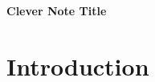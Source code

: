 \documentclass[12pt]{article}
\begin{document}
\thispagestyle{empty}		%

\begin{center}
    {\huge \textbf{Clever Note Title} \par}
\end{center}



\section{Introduction}
\end{document}
